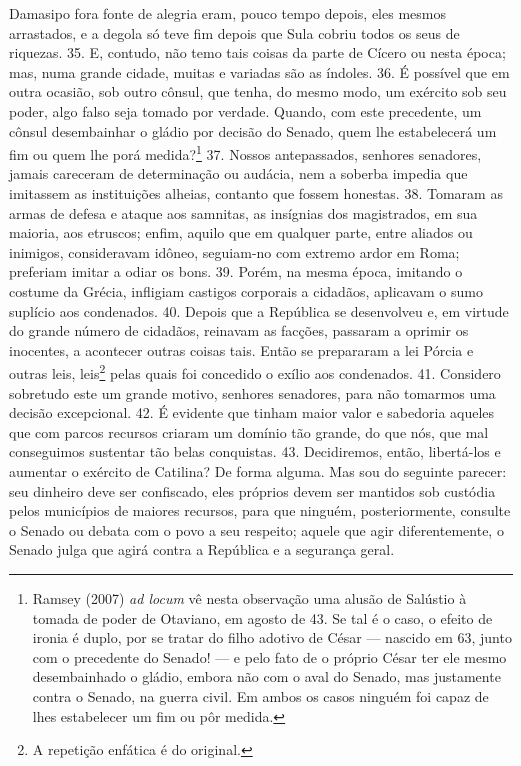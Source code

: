 Damasipo fora fonte de alegria eram, pouco tempo depois, eles mesmos
arrastados, e a degola só teve fim depois que Sula cobriu todos os seus de
riquezas. 35. E, contudo, não temo tais coisas da parte de  Cícero ou nesta
época; mas, numa grande cidade, muitas e variadas são as índoles. 36. É
possível que em outra ocasião, sob outro cônsul, que tenha, do mesmo modo, um
exército sob seu poder, algo falso seja tomado por verdade. Quando, com
este precedente, um cônsul desembainhar o gládio por decisão do Senado, quem
lhe estabelecerá um fim ou quem lhe porá medida?\footnote{Ramsey (2007)
\emph{ad locum} vê nesta observação uma alusão de Salústio à tomada de poder de
Otaviano, em agosto de 43. Se tal é o caso, o efeito de ironia é duplo, por se
tratar do filho adotivo de César --- nascido em 63, junto com o precedente do
Senado! --- e pelo fato de o próprio César ter ele mesmo desembainhado o
gládio, embora não com o aval do Senado, mas justamente contra o Senado, na guerra civil. Em
ambos os casos ninguém foi capaz de lhes estabelecer um fim ou pôr medida.} 37.
Nossos antepassados, senhores senadores, jamais careceram de determinação ou
audácia, nem a soberba impedia que imitassem as instituições alheias, contanto
que fossem honestas. 38. Tomaram as armas de defesa e ataque aos samnitas, as
insígnias dos magistrados, em sua maioria, aos etruscos; enfim, aquilo que em
qualquer parte, entre aliados ou inimigos, consideravam idôneo, seguiam-no com
extremo ardor em Roma; preferiam imitar a odiar os bons. 39. Porém, na mesma
época, imitando o costume da Grécia, infligiam castigos corporais a cidadãos,
aplicavam o sumo suplício aos condenados. 40. Depois que a República se
desenvolveu e, em virtude do grande número de cidadãos, reinavam as facções,
passaram a oprimir os inocentes, a acontecer outras coisas tais. Então se
prepararam a lei Pórcia e outras leis, leis\footnote{A repetição enfática é do original.}
pelas quais foi concedido o exílio aos condenados. 41. Considero sobretudo este
um grande motivo, senhores senadores, para não tomarmos uma decisão
excepcional. 42. É evidente que tinham maior valor e sabedoria aqueles que com
parcos recursos criaram um domínio tão grande, do que nós, que mal conseguimos
sustentar tão belas conquistas. 43. Decidiremos, então, libertá-los e aumentar
o exército de Catilina? De forma alguma. Mas sou do seguinte parecer: seu
dinheiro deve ser confiscado, eles próprios devem ser mantidos sob custódia
pelos municípios de maiores recursos, para que ninguém, posteriormente,
consulte o Senado ou debata com o povo a seu respeito; aquele que agir
diferentemente, o Senado julga que agirá contra a República e a segurança
geral.

